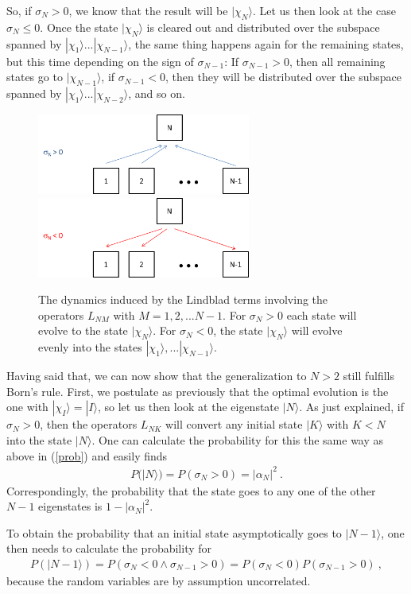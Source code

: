 \documentclass[11pt,twoside,A4]{article}
\def\beqn{\begin{eqnarray}}
\def\eeqn{\end{eqnarray}}
\begin{document}
So, if $\sigma_N>0$, we know that the result will be $|\chi_N\rangle$. Let us then look at the case $\sigma_N \leq 0.$ Once the state $|\chi_N\rangle$ is cleared out and distributed over the subspace spanned by $|\chi_1\rangle ... |\chi_{N-1}\rangle$, the same thing happens again for the remaining states, but this time depending on the sign of $\sigma_{N-1}$: If $\sigma_{N-1} >0$, then all remaining states go to $|\chi_{N-1}\rangle$, if $\sigma_{N-1} < 0$, then they will be distributed over the subspace spanned by $|\chi_1\rangle ... |\chi_{N-2}\rangle$, and so on. 

\begin{figure}[h]
\centering
\includegraphics[width=7cm]{sigma_pos.png}
\includegraphics[width=7cm]{sigma_neg.png}
\caption{The dynamics induced by the Lindblad terms involving the operators $L_{NM}$ with $M=1,2,...N-1$. For $\sigma_N>0$  each state will evolve to the state $|\chi_N\rangle$. For $\sigma_N<0$, the state $|\chi_N\rangle$ will evolve evenly into the states $|\chi_1\rangle,...|\chi_{N-1}\rangle$. \protect{\label{sigma}}}
 
\end{figure}

Having said that, we can now show that the generalization to $N>2$ still fulfills Born's rule. First, we postulate as previously that the optimal evolution is the one with $|\chi_I \rangle = |I \rangle$, so let us then look at the eigenstate $|N\rangle$. As just explained, if $\sigma_{N} > 0$, then the operators $L_{NK}$ will convert any initial state $|K\rangle$ with $K<N$ into the state $|N\rangle$. One can calculate the probability for this the same way as above in (\ref{prob}) and easily finds
\beqn
P(|N\rangle) = P(\sigma_N > 0) = |\alpha_N|^2~.
\eeqn
Correspondingly, the probability that the state goes to any one of the other $N-1$ eigenstates is $1-|\alpha_{N}|^2$. 

To obtain the probability that an initial state asymptotically goes to $|N-1\rangle$, one then needs to calculate the probability for
\beqn
P(|N -1\rangle) = P(\sigma_N < 0 \wedge \sigma_{N-1} > 0) = P(\sigma_N < 0) P(\sigma_{N-1} > 0)~,
\eeqn
because the random variables are by assumption uncorrelated. 
\end{document}
